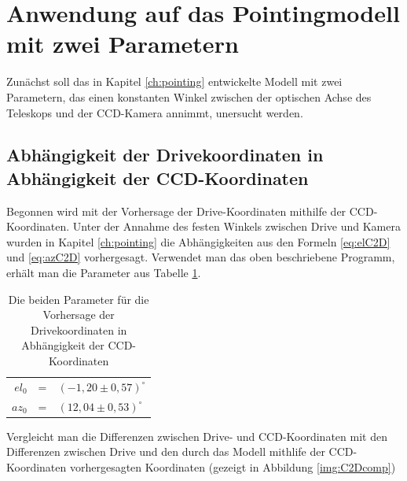 \section{Anwendung auf das Pointingmodell mit zwei Parametern}
Zunächst soll das in Kapitel \ref{ch:pointing} entwickelte Modell mit zwei Parametern, das einen konstanten Winkel zwischen der optischen Achse des Teleskops und der CCD-Kamera annimmt, unersucht werden.
\subsection{Abhängigkeit der Drivekoordinaten in Abhängigkeit der CCD-Koordinaten}
Begonnen wird mit der Vorhersage der Drive-Koordinaten mithilfe der CCD-Koordinaten. Unter der Annahme des festen Winkels zwischen Drive und Kamera wurden in Kapitel \ref{ch:pointing} die Abhängigkeiten aus den Formeln \ref{eq:elC2D} und \ref{eq:azC2D} vorhergesagt. Verwendet man das oben beschriebene Programm, erhält man die Parameter aus Tabelle \ref{tab:C2D}.
\begin{table}[htbp]
\centering
\begin{tabular}{rcl}
\toprule
$el_0$ &=& $(-1,20\pm0,57)^{\circ}$\\
$az_0$ &=& $(12,04\pm0,53)^{\circ}$\\
\bottomrule
\end{tabular}
\caption{Die beiden Parameter für die Vorhersage der Drivekoordinaten in Abhängigkeit der CCD-Koordinaten}
\label{tab:C2D}
\end{table}
Vergleicht man die Differenzen zwischen Drive- und CCD-Koordinaten mit den Differenzen zwischen Drive und den durch das Modell mithlife der CCD-Koordinaten vorhergesagten Koordinaten (gezeigt in Abbildung \ref{img:C2Dcomp})

